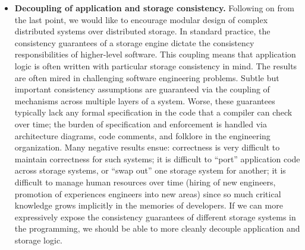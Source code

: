 \begin{itemize}
\item \textbf{Decoupling of application and storage consistency.}  Following on from the last point, we would like to encourage modular design of complex distributed systems over distributed storage.  In standard practice, the consistency guarantees of a storage engine dictate the consistency responsibilities of higher-level software.  This coupling means that application logic is often written with particular storage consistency in mind.  The results are often mired in challenging software engineering problems.  Subtle but important consistency assumptions are guaranteed via the coupling of mechanisms across multiple layers of a system.  Worse, these guarantees typically lack any formal specification in the code that a compiler can check over time; the burden of specification and enforcement is handled via architecture diagrams, code comments, and folklore in the engineering organization.  Many negative results ensue: correctness is very difficult to maintain correctness for such systems; it is difficult to ``port'' application code across storage systems, or ``swap out'' one storage system for another; it is difficult to manage human resources over time (hiring of new engineers, promotion of experiences engineers into new areas) since so much critical knowledge grows implicitly in the memories of developers.  If we can more expressively expose the consistency guarantees of different storage systems in the programming, we should be able to more cleanly decouple application and storage logic.
\end{itemize}

